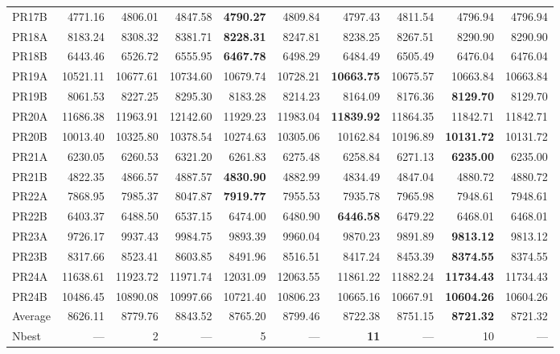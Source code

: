 \documentclass{setp-new}
\begin{document}
\begin{supertabular*}{\textwidth}{@{\extracolsep{\fill}}lrrrrrrrrr@{}}
    PR17B & 4771.16 & 4806.01 & 4847.58 & \textbf{4790.27} & 4809.84 & 4797.43 & 4811.54 & 4796.94 & 4796.94\\
    PR18A & 8183.24 & 8308.32 & 8381.71 & \textbf{8228.31} & 8247.81 & 8238.25 & 8267.51 & 8290.90 & 8290.90\\
    PR18B & 6443.46 & 6526.72 & 6555.95 & \textbf{6467.78} & 6498.29 & 6484.49 & 6505.49 & 6476.04 & 6476.04\\
    PR19A & 10521.11 & 10677.61 & 10734.60 & 10679.74 & 10728.21 & \textbf{10663.75} & 10675.57 & 10663.84 & 10663.84\\
    PR19B & 8061.53 & 8227.25 & 8295.30 & 8183.28 & 8214.23 & 8164.09 & 8176.36 & \textbf{8129.70} & 8129.70\\
    PR20A & 11686.38 & 11963.91 & 12142.60 & 11929.23 & 11983.04 & \textbf{11839.92} & 11864.35 & 11842.71 & 11842.71\\
    PR20B & 10013.40 & 10325.80 & 10378.54 & 10274.63 & 10305.06 & 10162.84 & 10196.89 & \textbf{10131.72} & 10131.72\\
    PR21A & 6230.05 & 6260.53 & 6321.20 & 6261.83 & 6275.48 & 6258.84 & 6271.13 & \textbf{6235.00} & 6235.00\\
    PR21B & 4822.35 & 4866.57 & 4887.57 & \textbf{4830.90} & 4882.99 & 4834.49 & 4847.04 & 4880.72 & 4880.72\\
    PR22A & 7868.95 & 7985.37 & 8047.87 & \textbf{7919.77} & 7955.53 & 7935.78 & 7965.98 & 7948.61 & 7948.61\\
    PR22B & 6403.37 & 6488.50 & 6537.15 & 6474.00 & 6480.90 & \textbf{6446.58} & 6479.22 & 6468.01 & 6468.01\\
    PR23A & 9726.17 & 9937.43 & 9984.75 & 9893.39 & 9960.04 & 9870.23 & 9891.89 & \textbf{9813.12} & 9813.12\\
    PR23B & 8317.66 & 8523.41 & 8603.85 & 8491.96 & 8516.51 & 8417.24 & 8453.39 & \textbf{8374.55} & 8374.55\\
    PR24A & 11638.61 & 11923.72 & 11971.74 & 12031.09 & 12063.55 & 11861.22 & 11882.24 & \textbf{11734.43} & 11734.43\\
    PR24B & 10486.45 & 10890.08 & 10997.66 & 10721.40 & 10806.23 & 10665.16 & 10667.91 & \textbf{10604.26} & 10604.26\\
    Average & 8626.11 & 8779.76 & 8843.52 & 8765.20 & 8799.46 & 8722.38 & 8751.15 & \textbf{8721.32} & 8721.32\\
    Nbest & --- & 2 & --- & 5 & --- & \textbf{11} & --- & 10 & ---\\
\end{supertabular*}
\tablehead{}\tabletail{}\tablelasttail{}
\endgroup
\end{document}
